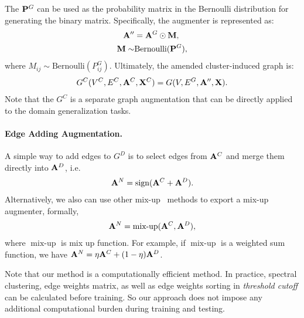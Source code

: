The  $\mathbf{P}^{G}$ can be used as the probability matrix in the Bernoulli distribution for generating the binary matrix. Specifically,  the augmenter is represented as:
\begin{align}
    \mathbf{A}'' &= \mathbf{A}^G \odot \mathbf{M},\\
    \mathbf{M}  \sim & \text{Bernoulli}(\mathbf{P}^G),
\end{align}
where $M_{ij} \sim \text{Bernoulli}(P^{G}_{ij})$.
Ultimately, the amended cluster-induced graph is:
\begin{align}
G^{C}(V^C, E^C, \mathbf{A}^C, \mathbf{X}^C) = G(V, E^G, \mathbf{A}'', \mathbf{X}).
\end{align}
Note that the $G^{C}$ is a separate graph augmentation that can be directly applied to the domain generalization tasks. 


\paragraph{Edge Adding Augmentation.}

A simple way to add edges to $G^D$ is to select edges from $\mathbf{A}^C$ and merge them directly into $\mathbf{A}^D$, i.e.
\begin{align}
\label{eq:simple_new_graph}
    \mathbf{A}^{N} = \operatorname{sign}(\mathbf{A}^C + \mathbf{A}^D).
\end{align}
Alternatively, we also can use other mix-up~\cite{han2022g} methods to export a mix-up augmenter, formally,
\begin{align}
    \mathbf{A}^{N} = \operatorname{mix-up}(\mathbf{A}^C, \mathbf{A}^D),
\end{align}
where $\operatorname{mix-up}$ is mix up function. For example, if $\operatorname{mix-up}$  is a weighted sum function, we have $\mathbf{A}^{N} = \eta \mathbf{A}^C + (1-\eta) \mathbf{A}^D $.

\begin{remark}
Note that our method is a computationally efficient method. In practice, spectral clustering, edge weights matrix, as well as edge weights sorting in \textit{threshold cutoff} can be calculated before training. So our approach does not impose any additional computational burden during training and testing.
\end{remark}



